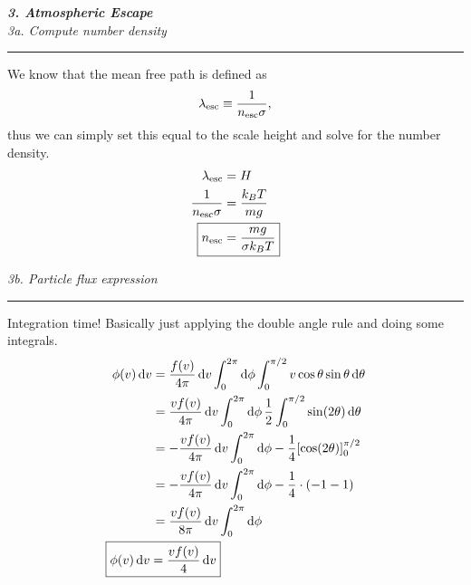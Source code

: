 \documentclass[12pt, letterpaper, twoside]{article}
\newcommand{\question}[1]{{\noindent \it #1}}
\newcommand{\answer}[1]{
    \par\noindent\rule{\textwidth}{0.4pt}#1\vspace{0.5cm}
}
\begin{document}
\pagebreak

\question{\textbf{3. Atmospheric Escape}}\\

\question{3a. Compute number density}
\answer{
    We know that the mean free path is defined as
    \begin{equation}
        \lambda_{\rm esc} \equiv \frac{1}{n_{\rm esc} \sigma},
    \end{equation}
    thus we can simply set this equal to the scale height and solve for the number density.
    \begin{align}
        \lambda_{\rm esc} &= H \\
        \frac{1}{n_{\rm esc} \sigma} &= \frac{k_B T}{m g} \\
        \Aboxed{ n_{\rm esc} &= \frac{m g}{\sigma k_B T} }
    \end{align}
}

\question{3b. Particle flux expression}
\answer{
    Integration time! Basically just applying the double angle rule and doing some integrals.
    \begin{align}
        \phi(v) \dd{v} &= \frac{f(v)}{4 \pi} \dd{v} \int_0^{2\pi} \dd{\phi} \int_0^{\pi/2} v \cos \theta \sin \theta \dd{\theta} \\
                       &= \frac{v f(v)}{4 \pi} \dd{v} \int_0^{2\pi} \dd{\phi} \frac{1}{2} \int_0^{\pi/2} \sin (2 \theta) \dd{\theta} \\
                       &= -\frac{v f(v)}{4 \pi} \dd{v} \int_0^{2\pi} \dd{\phi} -\frac{1}{4} \qty[\cos (2 \theta)]_0^{\pi/2} \\
                       &= -\frac{v f(v)}{4 \pi} \dd{v} \int_0^{2\pi} \dd{\phi} -\frac{1}{4} \cdot \qty(-1 - 1) \\
                       &= \frac{v f(v)}{8 \pi} \dd{v} \int_0^{2\pi} \dd{\phi} \\
        \Aboxed{ \phi(v) \dd{v}  &= \frac{v f(v)}{4} \dd{v} }
    \end{align}
}
\end{document}
